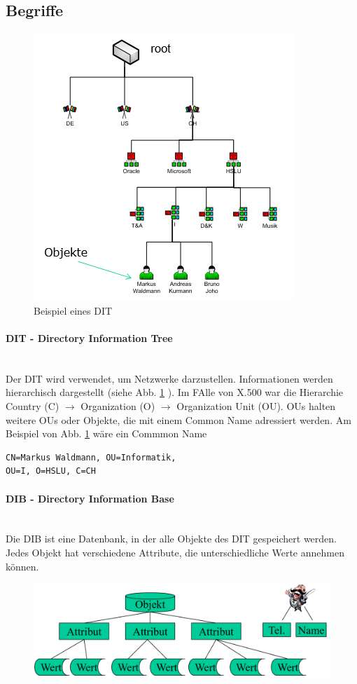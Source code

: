 \documentclass[a4paper, 11pt]{article}
\begin{document}
\subsection{Begriffe}
\begin{figure}
	\centering
	\includegraphics[keepaspectratio=true,height=10\baselineskip]{DIT.PNG}
	\caption{Beispiel eines DIT}
	\label{fig:dti}
\end{figure}
\paragraph{DIT - Directory Information Tree}\mbox{}\\
Der DIT wird verwendet, um Netzwerke darzustellen. Informationen werden hierarchisch dargestellt (siehe Abb. \ref{fig:dti} ). Im FAlle von X.500 war die Hierarchie Country (C) $\rightarrow$ Organization (O) $\rightarrow$ Organization Unit (OU). OUs halten weitere OUs oder Objekte, die mit einem Common Name adressiert werden. Am Beispiel von Abb. \ref{fig:dti} wäre ein Commmon Name 

\begin{lstlisting}
CN=Markus Waldmann, OU=Informatik, 
OU=I, O=HSLU, C=CH
\end{lstlisting}

\paragraph{DIB - Directory Information Base} \mbox{} \\
Die DIB ist eine Datenbank, in der alle Objekte des DIT gespeichert werden. Jedes Objekt hat verschiedene Attribute, die unterschiedliche Werte annehmen können.
\begin{figure}[htb]
	\centering
	\includegraphics[keepaspectratio=true,height=10\baselineskip]{DIB.PNG}
\end{figure}
\end{document}
